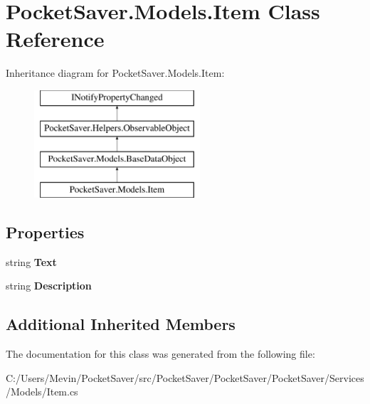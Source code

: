 \hypertarget{class_pocket_saver_1_1_models_1_1_item}{}\section{Pocket\+Saver.\+Models.\+Item Class Reference}
\label{class_pocket_saver_1_1_models_1_1_item}
Inheritance diagram for Pocket\+Saver.\+Models.\+Item\+:\begin{figure}[H]
\begin{center}
\leavevmode
\includegraphics[height=4.000000cm]{class_pocket_saver_1_1_models_1_1_item}
\end{center}
\end{figure}
\subsection*{Properties}
\begin{DoxyCompactItemize}
\item 
\mbox{\label{class_pocket_saver_1_1_models_1_1_item_a31de729c01ebd81d1014b89715b0302e}} 
string {\bfseries Text}
\item 
\mbox{\label{class_pocket_saver_1_1_models_1_1_item_a826ed24319ef431f685e6957fc5da8c3}} 
string {\bfseries Description}
\end{DoxyCompactItemize}
\subsection*{Additional Inherited Members}


The documentation for this class was generated from the following file\+:\begin{DoxyCompactItemize}
\item 
C\+:/\+Users/\+Mevin/\+Pocket\+Saver/src/\+Pocket\+Saver/\+Pocket\+Saver/\+Pocket\+Saver/\+Services/\+Models/Item.\+cs\end{DoxyCompactItemize}
